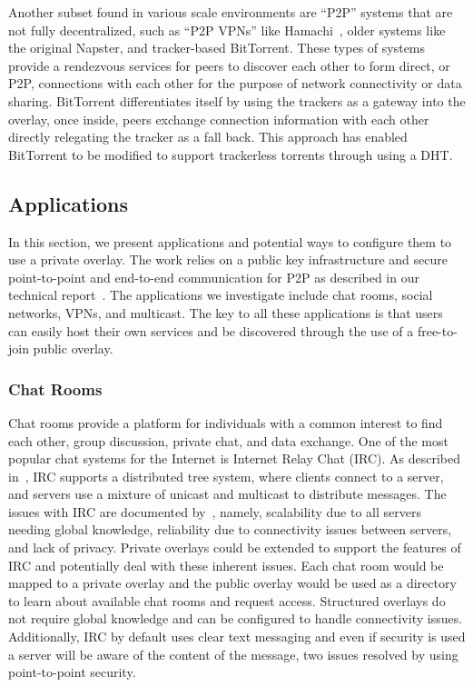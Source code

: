 \documentclass[conference]{IEEEtran}
\begin{document}
Another subset found in various scale environments are ``P2P'' systems that are
not fully decentralized, such as ``P2P VPNs'' like Hamachi~\cite{hamachi},
older systems like the original Napster, and tracker-based BitTorrent.  These
types of systems provide a rendezvous services for peers to discover each other
to form direct, or P2P, connections with each other for the purpose of network
connectivity or data sharing.  BitTorrent differentiates itself by using the
trackers as a gateway into the overlay, once inside, peers exchange connection
information with each other directly relegating the tracker as a fall back.
This approach has enabled BitTorrent to be modified to support trackerless
torrents through using a DHT.

\subsection{Applications}

In this section, we present applications and potential ways to configure them
to use a private overlay.  The work relies on a public key infrastructure and
secure point-to-point and end-to-end communication for P2P as described in our
technical report~\cite{vpo}.  The applications we investigate include chat
rooms, social networks, VPNs, and multicast.  The key to all these applications
is that users can easily host their own services and be discovered through the
use of a free-to-join public overlay.

\subsubsection{Chat Rooms}

Chat rooms provide a platform for individuals with a common interest to find
each other, group discussion, private chat, and data exchange.  One of the most
popular chat systems for the Internet is Internet Relay Chat (IRC).  As
described in~\cite{irc}, IRC supports a distributed tree system, where clients
connect to a server, and servers use a mixture of unicast and multicast to
distribute messages.  The issues with IRC are documented by~\cite{irc_arch},
namely, scalability due to all servers needing global knowledge, reliability
due to connectivity issues between servers, and lack of privacy.  Private
overlays could be extended to support the features of IRC and potentially deal
with these inherent issues.  Each chat room would be mapped to a private
overlay and the public overlay would be used as a directory to learn about
available chat rooms and request access.  Structured overlays do not require
global knowledge and can be configured to handle connectivity issues.
Additionally, IRC by default uses clear text messaging and even if security is
used a server will be aware of the content of the message, two issues resolved
by using point-to-point security.
\end{document}
